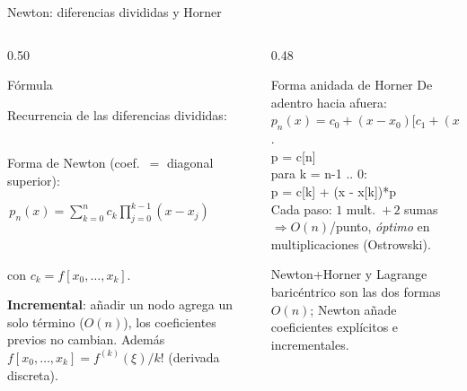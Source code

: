 \documentclass[aspectratio=169,10pt]{beamer}
\begin{document}
\begin{frame}{Newton: diferencias divididas y Horner}
\begin{columns}[T]
\begin{column}{0.50\textwidth}
\begin{cardidea}{Fórmula}{\faSuperscript}
{\footnotesize Recurrencia de las diferencias divididas:\\[0.6mm]
\centerline{}\\[1.2mm]
Forma de Newton (coef.\ $=$ diagonal superior):\\[0.8mm]
\centerline{$\boxed{\,\displaystyle p_n(x)=\sum_{k=0}^n c_k\!\prod_{j=0}^{k-1}(x-x_j)\,}$}\\[0.8mm]
\centerline{con \; $c_k=f[x_0,\dots,x_k]$.}}
\end{cardidea}
\vspace{1mm}
\begin{cardnota}[\faInfoCircle]
{\footnotesize \textbf{Incremental}: añadir un nodo agrega un solo término ($O(n)$), los coeficientes previos no cambian. Además $f[x_0,\dots,x_k]=f^{(k)}(\xi)/k!$ (derivada discreta).}
\end{cardnota}
\end{column}
\begin{column}{0.48\textwidth}
\begin{cardgear}{Forma anidada de Horner}{\faCalculator}
{\footnotesize De adentro hacia afuera:\\[0.2mm]
$p_n(x)=c_0+(x{-}x_0)\big[c_1+(x{-}x_1)[\cdots+(x{-}x_{n-1})c_n]\big]$.\\[1.0mm]
\ttfamily\scriptsize
p = c[n]\\
para k = n-1 .. 0:\\
\hspace{4mm}p = c[k] + (x - x[k])*p\\[0.6mm]
\rmfamily\footnotesize Cada paso: $1$ mult.\ $+\,2$ sumas $\Rightarrow O(n)$/punto, \emph{óptimo} en multiplicaciones (Ostrowski).}
\end{cardgear}
\vspace{1mm}
\begin{cardnota}[\faInfoCircle]
{\footnotesize Newton+Horner y Lagrange baricéntrico son las dos formas $O(n)$; Newton añade coeficientes explícitos e incrementales.}
\end{cardnota}
\end{column}
\end{columns}
\end{frame}
\end{document}

